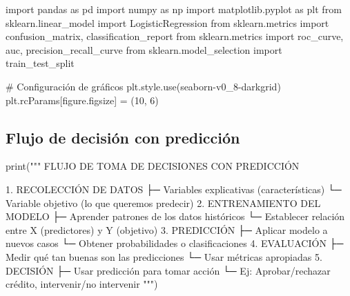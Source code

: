 \documentclass[
  doc,
  floatsintext,
  longtable,
  a4paper,
  nolmodern,
  notxfonts,
  notimes,
  12pt,
  colorlinks=true,linkcolor=blue,citecolor=blue,urlcolor=blue]{apa7}
\newenvironment{Shaded}{\begin{snugshade}}{\end{snugshade}}
\newcommand{\BuiltInTok}[1]{\textcolor[rgb]{0.00,0.23,0.31}{#1}}
\newcommand{\CommentTok}[1]{\textcolor[rgb]{0.37,0.37,0.37}{#1}}
\newcommand{\DecValTok}[1]{\textcolor[rgb]{0.68,0.00,0.00}{#1}}
\newcommand{\ImportTok}[1]{\textcolor[rgb]{0.00,0.46,0.62}{#1}}
\newcommand{\NormalTok}[1]{\textcolor[rgb]{0.00,0.23,0.31}{#1}}
\newcommand{\OperatorTok}[1]{\textcolor[rgb]{0.37,0.37,0.37}{#1}}
\newcommand{\StringTok}[1]{\textcolor[rgb]{0.13,0.47,0.30}{#1}}
\begin{document}
\begin{Shaded}
\begin{Highlighting}[]
\ImportTok{import}\NormalTok{ pandas }\ImportTok{as}\NormalTok{ pd}
\ImportTok{import}\NormalTok{ numpy }\ImportTok{as}\NormalTok{ np}
\ImportTok{import}\NormalTok{ matplotlib.pyplot }\ImportTok{as}\NormalTok{ plt}
\ImportTok{from}\NormalTok{ sklearn.linear\_model }\ImportTok{import}\NormalTok{ LogisticRegression}
\ImportTok{from}\NormalTok{ sklearn.metrics }\ImportTok{import}\NormalTok{ confusion\_matrix, classification\_report}
\ImportTok{from}\NormalTok{ sklearn.metrics }\ImportTok{import}\NormalTok{ roc\_curve, auc, precision\_recall\_curve}
\ImportTok{from}\NormalTok{ sklearn.model\_selection }\ImportTok{import}\NormalTok{ train\_test\_split}

\CommentTok{\# Configuración de gráficos}
\NormalTok{plt.style.use(}\StringTok{\textquotesingle{}seaborn{-}v0\_8{-}darkgrid\textquotesingle{}}\NormalTok{)}
\NormalTok{plt.rcParams[}\StringTok{\textquotesingle{}figure.figsize\textquotesingle{}}\NormalTok{] }\OperatorTok{=}\NormalTok{ (}\DecValTok{10}\NormalTok{, }\DecValTok{6}\NormalTok{)}
\end{Highlighting}
\end{Shaded}

\subsection{Flujo de decisión con
predicción}\label{flujo-de-decisiuxf3n-con-predicciuxf3n}

\begin{Shaded}
\begin{Highlighting}[]
\BuiltInTok{print}\NormalTok{(}\StringTok{"""}
\StringTok{FLUJO DE TOMA DE DECISIONES CON PREDICCIÓN}

\StringTok{1. RECOLECCIÓN DE DATOS}
\StringTok{   ├─ Variables explicativas (características)}
\StringTok{   └─ Variable objetivo (lo que queremos predecir)}
\StringTok{   }
\StringTok{2. ENTRENAMIENTO DEL MODELO}
\StringTok{   ├─ Aprender patrones de los datos históricos}
\StringTok{   └─ Establecer relación entre X (predictores) y Y (objetivo)}
\StringTok{   }
\StringTok{3. PREDICCIÓN}
\StringTok{   ├─ Aplicar modelo a nuevos casos}
\StringTok{   └─ Obtener probabilidades o clasificaciones}
\StringTok{   }
\StringTok{4. EVALUACIÓN}
\StringTok{   ├─ Medir qué tan buenas son las predicciones}
\StringTok{   └─ Usar métricas apropiadas}
\StringTok{   }
\StringTok{5. DECISIÓN}
\StringTok{   ├─ Usar predicción para tomar acción}
\StringTok{   └─ Ej: Aprobar/rechazar crédito, intervenir/no intervenir}
\StringTok{"""}\NormalTok{)}
\end{Highlighting}
\end{Shaded}
\end{document}
